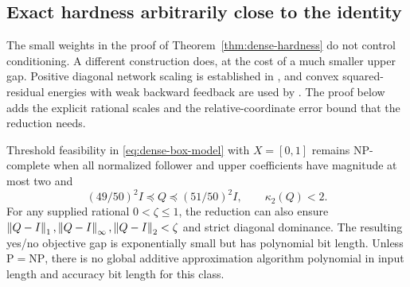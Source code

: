 \subsection{Exact hardness arbitrarily close to the identity}
\label{subsec:conditioned-hardness}
The small weights in the proof of Theorem~\ref{thm:dense-hardness} do not
control conditioning. A different construction does, at the cost of a much
smaller upper gap. Positive diagonal
network scaling is established in \citet[equations~(2.6)--(2.7)]{ElGhaouiEtAl2021},
and convex squared-residual energies with weak backward feedback are used by
\citet[Section~2]{ZachEstellers2019}. The proof below adds the explicit
rational scales and the relative-coordinate error bound that the reduction
needs.

\begin{theorem}\label{thm:conditioned-hardness}
Threshold feasibility in \eqref{eq:dense-box-model} with \(X=[0,1]\) remains NP-complete when
all normalized follower and upper coefficients have magnitude at most two and
\[
 (49/50)^2 I\preceq Q\preceq(51/50)^2 I,\qquad \kappa_2(Q)<2.
\]
For any supplied rational \(0<\zeta\le1\), the reduction can also ensure
\(\left\lVert Q-I\right\rVert_1,\left\lVert Q-I\right\rVert_\infty,\left\lVert Q-I\right\rVert_2<\zeta\) and strict diagonal
dominance. The resulting yes/no objective gap is exponentially small but has
polynomial bit length. Unless \(\mathrm P=\mathrm{NP}\), there is no global
additive approximation algorithm polynomial in input length and accuracy bit
length for this class.
\end{theorem}
